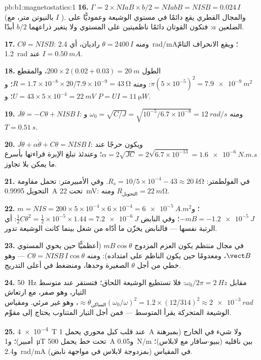 \begin{solution}{pb:b1:magnetostatics:1}
\textbf{16.} $\Gamma = 2 \times NIaB \times b/2 = NIabB = NISB = 0.024\,I$ (بالنيوتن متر، مع $I$
). والمجال القطري يقع دائمًا في مستوي الوشيعة وعموديًّا
على الضلعين $a$: فتكون القوتان دائمًا ناظميتين على المستوي ولا يتغير
ذراعهما $b/2$ أبدًا.

\textbf{17.} $C\theta = NISB$: ومنه $\theta = 2400\,I$ راديان، أي \qty{2.4}{rad/mA}؛ ويقع
الانحراف التامّ \qty{1.2}{rad} عند $I = \qty{0.50}{mA}$.

\textbf{18.} الطول $200 \times 2(0.02 + 0.03) = \qty{20}{m}$، والمقطع $\pi(5 \times
10^{-5})^2 = \qty{7.9e-9}{m^2}$: ومنه $R = 1.7 \times 10^{-8} \times 20/7.9 \times 10^{-9} =
\qty{43}{\ohm}$؛ و $U = 43 \times 5 \times 10^{-4} = \qty{22}{mV}$؛ و $P = UI = \qty{11}{\micro W}$.

\textbf{19.} $J\ddot\theta = -C\theta + NISB\,I$: ومنه $\omega_0 = \sqrt{C/J} = \sqrt{10^{-5}/6.7
\times 10^{-8}} = \qty{12}{rad/s}$ و $T = \qty{0.51}{s}$.

\textbf{20.} $J\ddot\theta + \alpha\dot\theta + C\theta = NISB\,I$: ويكون حرجًا عند
$\alpha = 2\sqrt{JC} = 2\sqrt{6.7 \times 10^{-13}} = \qty{1.6e-6}{N.m.s}$؛ وعندئذ تبلغ الإبرة
قراءتها بأسرع ما يمكن بلا تجاوز.

\textbf{21.} في الفولطمتر: $R_s = 10/5 \times 10^{-4} - 43 \approx \qty{20}{k\ohm}$.
وفي الأمبيرمتر: تحمل مقاومة التحويل \qty{0.9995}{A} تحت \qty{22}{mV}: ومنه $R_{\text{التحويل}} =
\qty{22}{m\ohm}$.

\textbf{22.} $m = NIS = 200 \times 5 \times 10^{-4} \times 6 \times 10^{-4} = \qty{6e-5}{A.m^2}$؛
و $-mB = \qty{-1.2e-5}{J}$؛ وفي النابض $\tfrac12C\theta^2 = \tfrac12 \times 10^{-5} \times 1.44 =
\qty{7.2e-6}{J}$: أي الرتبة نفسها --- فالنابض يخزّن ما أدّاه  من شغل بينما كانت الوشيعة تدور.

\textbf{23.} في مجال منتظم يكون العزم المزدوج $mB\cos\theta$ (أعظميًّا حين
يحوي المستوي $\vect B$، ومعدومًا حين يكون الناظم على امتداده): ومنه $C\theta =
NISB\,I\cos\theta$ --- وهو خطي من أجل $\theta$ الصغيرة وحدها، ومنضغط في
أعلى التدريج.

\textbf{24.} \qty{50}{Hz} مقابل $\omega_0/2\pi = \qty{2}{Hz}$: فلا تستطيع الوشيعة
اللحاق؛ فتستقر عند متوسط التيار، وهو صفر، مع ارتعاش
 $\approx \theta_{\text{الساكن}}(\omega_0/\omega)^2 = 1.2 \times (12/314)^2 \approx
\qty{2e-3}{rad}$، وهو غير مرئي. ومقياس الوشيعة المتحركة يقرأ المتوسط --- فمن أجل
التيار المتناوب يحتاج إلى مقوِّم.

\textbf{25.} \qty{4e-4}{T} عند قلب كبل محوري يحمل \qty{1}{A} ولا شيء في الخارج
(بمبرهنة أمبير)؛ و\qty{1}{\micro T} تحت خط يحمل \qty{500}{A} و\qty{0.05}{N/m}
بين ناقليه (ببيو-سافار مع لابلاس)؛ و\qty{2.4}{rad/mA} في
المقياس (بمزدوجة لابلاس في مواجهة نابض).
\end{solution}
